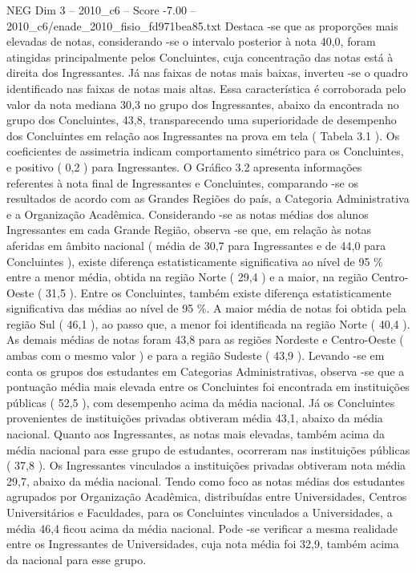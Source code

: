 \begin{textsample}{NEG Dim 3 – 2010\_c6 – Score -7.00 – 2010\_c6/enade\_2010\_fisio\_fd971bea85.txt}
Destaca -se que as proporções mais elevadas de notas, considerando -se o intervalo posterior à nota 40,0, foram atingidas principalmente pelos Concluintes, cuja concentração das notas está à direita dos Ingressantes.
Já nas faixas de notas mais baixas, inverteu -se o quadro identificado nas faixas de notas mais altas.
Essa característica é corroborada pelo valor da nota mediana 30,3 no grupo dos Ingressantes, abaixo da encontrada no grupo dos Concluintes, 43,8, transparecendo uma superioridade de desempenho dos Concluintes em relação aos Ingressantes na prova em tela ( Tabela 3.1 ).
Os coeficientes de assimetria indicam comportamento simétrico para os Concluintes, e positivo ( 0,2 ) para Ingressantes.
O Gráfico 3.2 apresenta informações referentes à nota final de Ingressantes e Concluintes, comparando -se os resultados de acordo com as Grandes Regiões do país, a Categoria Administrativa e a Organização Acadêmica.
Considerando -se as notas médias dos alunos Ingressantes em cada Grande Região, observa -se que, em relação às notas aferidas em âmbito nacional ( média de 30,7 para Ingressantes e de 44,0 para Concluintes ), existe diferença estatisticamente significativa ao nível de 95 \% entre a menor média, obtida na região Norte ( 29,4 ) e a maior, na região Centro-Oeste ( 31,5 ).
Entre os Concluintes, também existe diferença estatisticamente significativa das médias ao nível de 95 \%.
A maior média de notas foi obtida pela região Sul ( 46,1 ), ao passo que, a menor foi identificada na região Norte ( 40,4 ).
As demais médias de notas foram 43,8 para as regiões Nordeste e Centro-Oeste ( ambas com o mesmo valor ) e para a região Sudeste ( 43,9 ).
Levando -se em conta os grupos dos estudantes em Categorias Administrativas, observa -se que a pontuação média mais elevada entre os Concluintes foi encontrada em instituições públicas ( 52,5 ), com desempenho acima da média nacional.
Já os Concluintes provenientes de instituições privadas obtiveram média 43,1, abaixo da média nacional.
Quanto aos Ingressantes, as notas mais elevadas, também acima da média nacional para esse grupo de estudantes, ocorreram nas instituições públicas ( 37,8 ).
Os Ingressantes vinculados a instituições privadas obtiveram nota média 29,7, abaixo da média nacional.
Tendo como foco as notas médias dos estudantes agrupados por Organização Acadêmica, distribuídas entre Universidades, Centros Universitários e Faculdades, para os Concluintes vinculados a Universidades, a média 46,4 ficou acima da média nacional.
Pode -se verificar a mesma realidade entre os Ingressantes de Universidades, cuja nota média foi 32,9, também acima da nacional para esse grupo.

\end{textsample}

